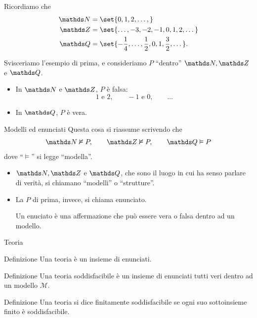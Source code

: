 \documentclass[babel]{beamer}
\begin{document}
\begin{frame}[label={sec:org17c96ba}]{\null}
Ricordiamo che
\begin{align*}
\N &= \set{0,1,2,\dots,}\\
\Z &= \set{\dots, -3,-2,-1,0,1,2,\dots}\\
\Q &= \set{-\frac{1}{4}, \dots ,\frac{1}{2}, 0, 1, \frac{3}{2}, \dots}.
\end{align*}

Svisceriamo l'esempio di prima, e consideriamo \(P\) ``dentro'' \(\N, \Z\) e \(\Q\).
\begin{itemize}
\item In \(\N\) e \(\Z\), \(P\) è \alert{falsa}:
\begin{equation*}
  1\text{ e } 2,\qquad -1\text{ e } 0, \qquad \dots
\end{equation*}
\item In \(\Q\), \(P\) è \alert{vera}.
\end{itemize}
\end{frame}
\begin{frame}[label={sec:orgf3dc7e7}]{Modelli ed enunciati}
Questa cosa si riassume scrivendo che
\begin{equation*}
\N \nvDash P,\qquad \Z\nvDash P, \qquad \Q\vDash P
\end{equation*}
dove ``\(\vDash\)'' si legge ``modella''.

\begin{itemize}
\item \(\N, \Z\) e \(\Q\), che sono \alert{il luogo in cui ha senso parlare di verità}, si chiamano ``modelli'' o ``strutture''.
\item La \(P\) di prima, invece, si chiama \alert{enunciato}.

Un enuciato è una affermazione che può essere vera o falsa \alert{dentro ad un modello}.
\end{itemize}
\end{frame}
\begin{frame}[label={sec:org64a228a}]{Teoria}
\begin{block}{Definizione}
Una \alert{teoria} è un insieme di enunciati.
\end{block}
\begin{block}{Definizione}
Una \alert{teoria soddisfacibile} è un insieme di enunciati \alert{tutti veri dentro ad un modello \(\mathcal{M}\)}.
\end{block}
\begin{block}{Definizione}
Una teoria si dice \alert{finitamente soddisfacibile} se ogni suo sottoinsieme finito è soddisfacibile.
\end{block}
\end{frame}
\end{document}
